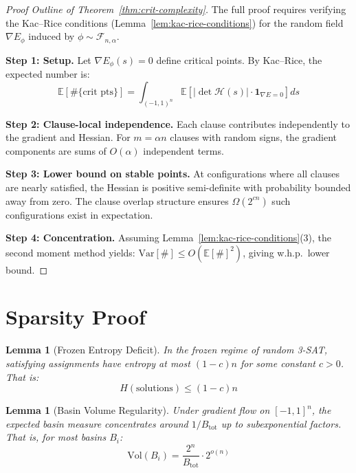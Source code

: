 \documentclass[11pt,a4paper]{article}
\theoremstyle{plain}
\newtheorem{lemma}[theorem]{Lemma}
\theoremstyle{definition}
\theoremstyle{remark}
\newcommand{\E}{\mathbb{E}}
\newcommand{\Hess}{\mathcal{H}}
\begin{document}
\begin{proof}[Proof Outline of Theorem~\ref{thm:crit-complexity}]
The full proof requires verifying the Kac--Rice conditions (Lemma~\ref{lem:kac-rice-conditions}) for the random field $\nabla E_\phi$ induced by $\phi \sim \mathcal{F}_{n,\alpha}$.

\textbf{Step 1: Setup.}
Let $\nabla E_\phi(s) = 0$ define critical points. By Kac--Rice, the expected number is:
\begin{equation}
    \E[\#\{\text{crit pts}\}] = \int_{(-1,1)^n} \E\left[|\det \Hess(s)| \cdot \mathbf{1}_{\nabla E = 0}\right] ds
\end{equation}

\textbf{Step 2: Clause-local independence.}
Each clause contributes independently to the gradient and Hessian. For $m = \alpha n$ clauses with random signs, the gradient components are sums of $O(\alpha)$ independent terms.

\textbf{Step 3: Lower bound on stable points.}
At configurations where all clauses are nearly satisfied, the Hessian is positive semi-definite with probability bounded away from zero. The clause overlap structure ensures $\Omega(2^{cn})$ such configurations exist in expectation.

\textbf{Step 4: Concentration.}
Assuming Lemma~\ref{lem:kac-rice-conditions}(3), the second moment method yields: $\text{Var}[\#] \leq O(\E[\#]^2)$, giving w.h.p.\ lower bound.
\end{proof}

\section{Sparsity Proof}
\label{app:sparsity}

\begin{lemma}[Frozen Entropy Deficit]
\label{lem:entropy-deficit}
In the frozen regime of random 3-SAT, satisfying assignments have entropy at most $(1-c)n$ for some constant $c > 0$. That is:
\begin{equation}
    H(\text{solutions}) \leq (1-c)n
\end{equation}
\end{lemma}

\begin{lemma}[Basin Volume Regularity]
\label{lem:volume-regularity}
Under gradient flow on $[-1,1]^n$, the expected basin measure concentrates around $1/B_{\text{tot}}$ up to subexponential factors. That is, for most basins $B_i$:
\begin{equation}
    \text{Vol}(B_i) = \frac{2^n}{B_{\text{tot}}} \cdot 2^{o(n)}
\end{equation}
\end{lemma}
\end{document}
